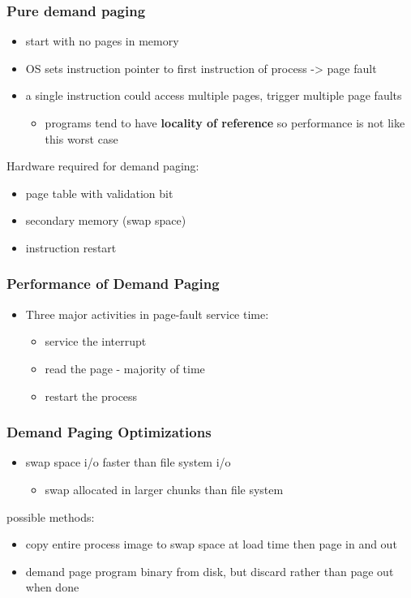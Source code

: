 \documentclass[11pt]{article}
\begin{document}
\subsubsection{Pure demand paging}
\label{sec:org42de1b4}
\begin{itemize}
\item start with no pages in memory
\item OS sets instruction pointer to first instruction of process -> page fault
\item a single instruction could access multiple pages, trigger multiple page faults
\begin{itemize}
\item programs tend to have \textbf{locality of reference} so performance is not like this worst case
\end{itemize}
\end{itemize}
Hardware required for demand paging:
\begin{itemize}
\item page table with validation bit
\item secondary memory (swap space)
\item instruction restart
\end{itemize}
\subsubsection{Performance of Demand Paging}
\label{sec:org7312392}
\begin{itemize}
\item Three major activities in page-fault service time:
\begin{itemize}
\item service the interrupt
\item read the page - majority of time
\item restart the process
\end{itemize}
\end{itemize}
\subsubsection{Demand Paging Optimizations}
\label{sec:org742e22a}
\begin{itemize}
\item swap space i/o faster than file system i/o
\begin{itemize}
\item swap allocated in larger chunks than file system
\end{itemize}
\end{itemize}
possible methods:
\begin{itemize}
\item copy entire process image to swap space at load time then page in and out
\item demand page program binary from disk, but discard rather than page out when done
\end{itemize}
\end{document}

